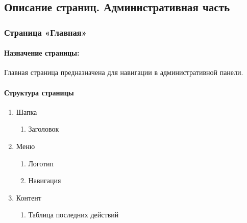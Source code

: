 \subsection{Описание страниц. Административная часть}
\subsubsection{Страница «Главная»}
\paragraph{Назначение страницы:}
Главная страница предназначена для навигации в административной панели.

\paragraph{Структура страницы}
\begin{enumerate}
  \item Шапка
  \begin{enumerate}
    \item Заголовок
  \end{enumerate}

  \item Меню
  \begin{enumerate}
    \item  Логотип
    \item  Навигация
  \end{enumerate}

  \item  Контент
  \begin{enumerate}
    \item  Таблица последних действий
  \end{enumerate}
\end{enumerate}

